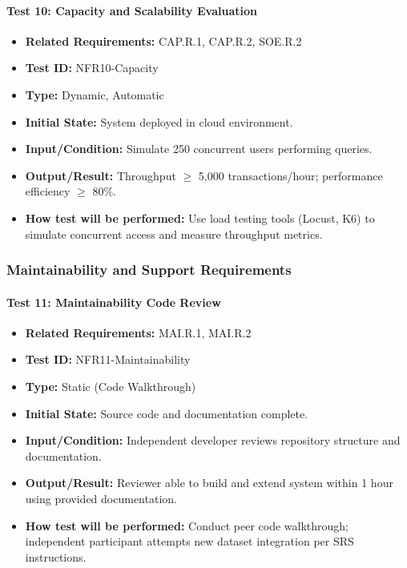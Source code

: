 \documentclass[12pt, titlepage]{article}
\begin{document}
\paragraph{Test 10: Capacity and Scalability Evaluation}
\begin{itemize}
    \item \textbf{Related Requirements:} CAP.R.1, CAP.R.2, SOE.R.2
    \item \textbf{Test ID:} NFR10-Capacity
    \item \textbf{Type:} Dynamic, Automatic
    \item \textbf{Initial State:} System deployed in cloud environment.
    \item \textbf{Input/Condition:} Simulate 250 concurrent users performing queries.
    \item \textbf{Output/Result:} Throughput $\geq$ 5,000 transactions/hour; performance efficiency $\geq$ 80\%.
    \item \textbf{How test will be performed:} Use load testing tools (Locust, K6) to simulate concurrent access and measure throughput metrics.
\end{itemize}

\subsubsection{Maintainability and Support Requirements}

\paragraph{Test 11: Maintainability Code Review}
\begin{itemize}
    \item \textbf{Related Requirements:} MAI.R.1, MAI.R.2
    \item \textbf{Test ID:} NFR11-Maintainability
    \item \textbf{Type:} Static (Code Walkthrough)
    \item \textbf{Initial State:} Source code and documentation complete.
    \item \textbf{Input/Condition:} Independent developer reviews repository structure and documentation.
    \item \textbf{Output/Result:} Reviewer able to build and extend system within 1 hour using provided documentation.
    \item \textbf{How test will be performed:} Conduct peer code walkthrough; independent participant attempts new dataset integration per SRS instructions.
\end{itemize}
\end{document}
